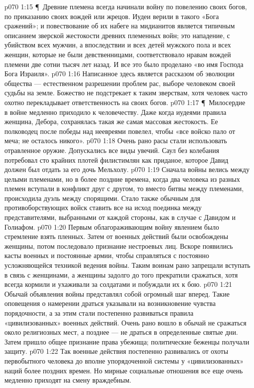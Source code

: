 \vs p070 1:15 \P\ Древние племена всегда начинали войну по повелению своих богов, по приказанию своих вождей или жрецов. Иудеи верили в такого «Бога сражений»; и повествование об их набеге на мидианитов является типичным описанием зверской жестокости древних племенных войн; это нападение, с убийством всех мужчин, а впоследствии и всех детей мужского пола и всех женщин, которые не были девственницами, соответствовало нравам вождей племени две сотни тысяч лет назад. И все это было проделано «во имя Господа Бога Израиля».
\vs p070 1:16 Написанное здесь является рассказом об эволюции общества --- естественном разрешении проблем рас, выборе человеком своей судьбы на земле. Божество не подстрекает к таким зверствам, хотя человек часто охотно перекладывает ответственность на своих богов.
\vs p070 1:17 \P\ Милосердие в войне медленно приходило к человечеству. Даже когда иудеями правила женщина, Дебора, сохранялась такая же самая массовая жестокость. Ее полководец после победы над неевреями повелел, чтобы «все войско пало от меча; не осталось никого».
\vs p070 1:18 Очень рано расы стали использовать отравленное оружие. Допускались все виды увечий. Саул без колебания потребовал сто крайних плотей филистимлян как приданое, которое Давид должен был отдать за его дочь Мельхолу.
\vs p070 1:19 Сначала войны велись между целыми племенами, но в более поздние времена, когда два человека из разных племен вступали в конфликт друг с другом, то вместо битвы между племенами, происходила дуэль между спорящими. Стало также обычным для противоборствующих войск ставить все на исход поединка между представителями, выбранными от каждой стороны, как в случае с Давидом и Голиафом.
\vs p070 1:20 Первым облагораживающим войну явлением было стремление взять пленных. Затем от военных действий были освобождены женщины, потом последовало признание нестроевых лиц. Вскоре появились касты военных и постоянные армии, чтобы справляться с постоянно усложняющейся техникой ведения войны. Таким воинам рано запрещали вступать в связь с женщинами, а женщины задолго до того прекратили сражаться, хотя всегда кормили и ухаживали за солдатами и побуждали их к бою.
\vs p070 1:21 Обычай объявления войны представлял собой огромный шаг вперед. Такие оповещения о намерении драться указывали на возникновение чувства порядочности, а за этим стали постепенно развиваться правила «цивилизованных» военных действий. Очень рано вошло в обычай не сражаться около религиозных мест, а позднее --- не драться в определенные святые дни. Затем пришло общее признание права убежища; политические беженцы получали защиту.
\vs p070 1:22 Так военные действия постепенно развивались от охоты первобытного человека до вполне упорядоченной системы у «цивилизованных» наций более поздних времен. Но мирные социальные отношения все еще очень медленно приходят на смену враждебным.
